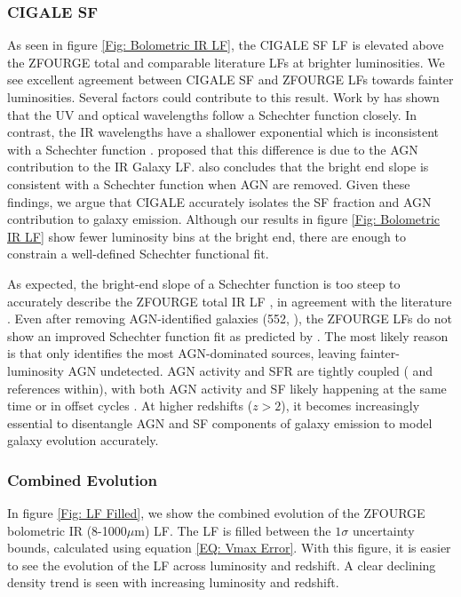 \subsubsection{CIGALE SF}
As seen in figure \ref{Fig: Bolometric IR LF}, the CIGALE SF LF is elevated above the ZFOURGE total and comparable literature LFs at brighter luminosities. We see excellent agreement between CIGALE SF and ZFOURGE LFs towards fainter luminosities. Several factors could contribute to this result. Work by \cite{wu_mid-infrared_2011} has shown that the UV and optical wavelengths follow a Schechter function closely. In contrast, the IR wavelengths have a shallower exponential which is inconsistent with a Schechter function \citep{symeonidis_what_2019}. \cite{fu_decomposing_2010} proposed that this difference is due to the AGN contribution to the IR Galaxy LF. \cite{wu_mid-infrared_2011} also concludes that the bright end slope is consistent with a Schechter function when AGN are removed. Given these findings, we argue that CIGALE accurately isolates the SF fraction and AGN contribution to galaxy emission. Although our results in figure \ref{Fig: Bolometric IR LF} show fewer luminosity bins at the bright end, there are enough to constrain a well-defined Schechter functional fit.

As expected, the bright-end slope of a Schechter function is too steep to accurately describe the ZFOURGE total IR LF \citep{wu_mid-infrared_2011}, in agreement with the literature \citep{rodighiero_mid-_2010, gruppioni_herschel_2013, symeonidis_what_2019}. Even after removing AGN-identified galaxies (552, \citealp{cowley_zfourge_2016}), the ZFOURGE LFs do not show an improved Schechter function fit as predicted by \cite{fu_decomposing_2010, wu_mid-infrared_2011}. The most likely reason is that \cite{cowley_zfourge_2016} only identifies the most AGN-dominated sources, leaving fainter-luminosity AGN undetected. AGN activity and SFR are tightly coupled (\citealp{alexander_what_2012} and references within), with both AGN activity and SF likely happening at the same time or in offset cycles \citep{cowley_decoupled_2018}. At higher redshifts ($z > 2$), it becomes increasingly essential to disentangle AGN and SF components of galaxy emission to model galaxy evolution accurately.

\subsubsection{Combined Evolution}
In figure \ref{Fig: LF Filled}, we show the combined evolution of the ZFOURGE bolometric IR (8-1000$\mu$m) LF. The LF is filled between the $1\sigma$ uncertainty bounds, calculated using equation \ref{EQ: Vmax Error}. With this figure, it is easier to see the evolution of the LF across luminosity and redshift. A clear declining density trend is seen with increasing luminosity and redshift.

